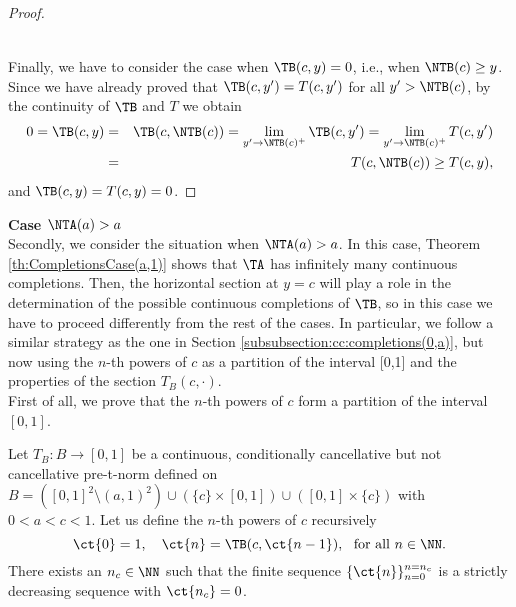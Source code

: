 \begin{proof}
\begin{itemize}
\begin{eqnarray*}
		\end{eqnarray*}
	\end{itemize}
	Finally, we have to consider the case when $\TB(c,y)=0$, i.e., when $\NTB(c) \geq y$. Since we have already proved that $\TB(c,y')=T(c,y')$ for all $y'> \NTB(c)$, by the continuity of $\TB$ and $T$ we obtain
	\begin{eqnarray*}
		0 = \TB(c,y) &=& \TB(c,\NTB(c)) = \lim_{y' \to \NTB(c)^{+}} \TB(c,y') = \lim_{y' \to \NTB(c)^{+}} T(c,y') \\
		&=& T(c,\NTB(c)) \geq T(c,y),
	\end{eqnarray*}
	and $\TB(c,y)=T(c,y)=0$.
\end{proof}

\noindent \textbf{Case $\NTA(a) > a$}\\

Secondly, we consider the situation when $\NTA(a) > a$. In this case, Theorem \ref{th:CompletionsCase(a,1)} shows that $\TA$ has infinitely many continuous completions. Then, the horizontal section at $y=c$ will play a role in the determination of the possible continuous completions of $\TB$, so in this case we have to proceed differently from the rest of the cases. In particular, we follow a similar strategy as the one in Section \ref{subsubsection:cc:completions(0,a)}, but now using the $n$-th powers of $c$ as a partition of the interval [0,1] and the properties of the section $T_B(c,\cdot)$.\\

First of all, we prove that the $n$-th powers of $c$ form a partition of the interval $[0,1]$.

\begin{lemma}\label{lem:cpowers}
	Let $T_B : B \to [0,1]$ be a continuous, conditionally cancellative but not cancellative pre-t-norm defined on $B=([0,1]^2 \setminus (a,1)^2) \cup (\{c\} \times [0,1]) \cup ([0,1] \times \{c\})$ with $0<a<c<1$. Let us define the $n$-th powers of $c$ recursively
	$$\ct{0}=1, \quad \ct{n} =\TB(c,\ct{n-1}),~~ \text{for all } n \in \NN.$$
	There exists an $n_c \in \NN$ such that the finite sequence $\{\ct{n}\}_{n=0}^{n=n_c}$ is a strictly decreasing sequence with $\ct{n_c}=0$.
\end{lemma}

